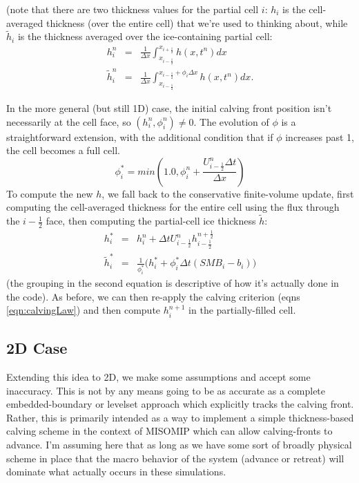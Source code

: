 \documentclass[12pt]{article}
\newcommand{\half}{\frac{1}{2}}
\begin{document}
(note that there are two thickness values for the partial cell $i$:  $h_i$ is the cell-averaged thickness (over the entire cell) that we're used to thinking about, while $\tilde{h}_i$ is the thickness averaged over the ice-containing partial cell: 
\begin{eqnarray}
h_i^n & = & \frac{1}{\Delta x} \int^{x_{i+\half}}_{x_{i-\half}} h(x,t^n) dx \\
\tilde{h}^n_i & = & \frac{1}{\Delta x} \int_{x_{i-\half}}^{x_{i-\half} + \phi_i \Delta x} h(x,t^n) dx.
\end{eqnarray}

In the more general (but still 1D) case, the initial calving front position isn't necessarily at the cell face, so $(h^n_i, \phi^n_i) \ne 0$. The evolution of $\phi$ is a straightforward extension, with the additional condition that if $\phi$ increases past 1, the cell becomes a full cell.
\begin{equation}
\phi^{*}_{i} = min(1.0, \phi^n_i + \frac{ U^{n}_{i-\half} \Delta t}{\Delta x})
\label{eqn:newPhi2}
\end{equation}
To compute the new $h$, we fall back to the conservative finite-volume update, first computing the cell-averaged thickness for the entire cell using the flux through the $i-\half$ face, then computing the partial-cell ice thickness $\tilde{h}$:
\begin{eqnarray}
h_i^{*} & = & h^n_i + \Delta t U^{n}_{i-\half} h^{n+\half}_{i-\half} \\
\tilde{h}^*_{i} & = & \frac{1}{\phi^*_i}\bigl(h^*_i + \phi^*_i \Delta t (SMB_i - b_i ) \bigr) 
\end{eqnarray}
(the grouping in the second equation is descriptive of how it's actually done in the code). As before, we can then re-apply the calving criterion (eqns \ref{eqn:calvingLaw})  and then compute $h^{n+1}_i$ in the partially-filled cell.

\subsection*{2D Case}
Extending this idea to 2D, we make some assumptions and accept some inaccuracy. This is not by any means going to be as accurate as a complete embedded-boundary or levelset approach which explicitly tracks the calving front. Rather, this is primarily intended as a way to implement a simple thickness-based calving scheme in the context of MISOMIP which can allow calving-fronts to advance. I'm assuming here that as long as we have some sort of broadly physical scheme in place that the macro behavior of the system (advance or retreat) will dominate what actually occurs in these simulations.
\end{document}
